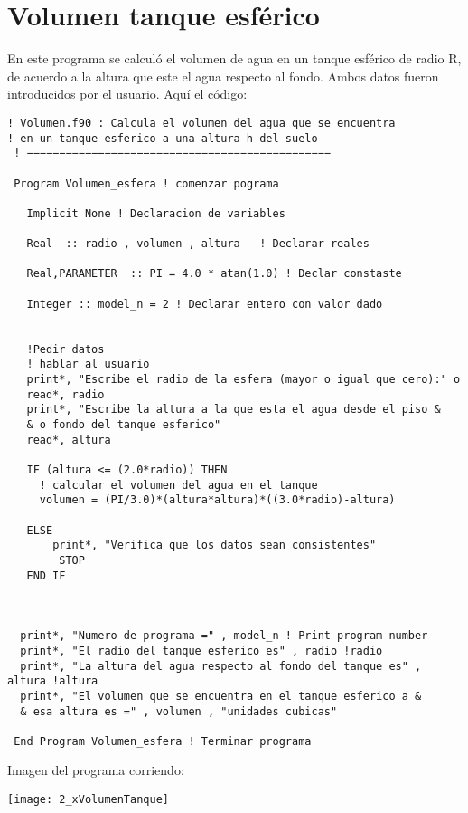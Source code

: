 \documentclass[notitlepage,12pt]{article}
\begin{document}
\section{Volumen tanque esf\'erico}
En este programa se calcul\'o el volumen de agua en un tanque esf\'erico de radio R,
de acuerdo a la altura que este el agua respecto al fondo. Ambos datos fueron introducidos
por el usuario.
Aqu\'i el c\'odigo:
\begin{verbatim}
! Volumen.f90 : Calcula el volumen del agua que se encuentra 
! en un tanque esferico a una altura h del suelo
 ! −−−−−−−−−−−−−−−−−−−−−−−−−−−−−−−−−−−−−−−−−−−−−−−

 Program Volumen_esfera ! comenzar pograma

   Implicit None ! Declaracion de variables

   Real  :: radio , volumen , altura   ! Declarar reales

   Real,PARAMETER  :: PI = 4.0 * atan(1.0) ! Declar constaste

   Integer :: model_n = 2 ! Declarar entero con valor dado

   
   !Pedir datos
   ! hablar al usuario
   print*, "Escribe el radio de la esfera (mayor o igual que cero):" o
   read*, radio
   print*, "Escribe la altura a la que esta el agua desde el piso &
   & o fondo del tanque esferico"   
   read*, altura

   IF (altura <= (2.0*radio)) THEN
     ! calcular el volumen del agua en el tanque   
     volumen = (PI/3.0)*(altura*altura)*((3.0*radio)-altura)
   
   ELSE
       print*, "Verifica que los datos sean consistentes"
        STOP
   END IF
  


  print*, "Numero de programa =" , model_n ! Print program number
  print*, "El radio del tanque esferico es" , radio !radio
  print*, "La altura del agua respecto al fondo del tanque es" , altura !altura
  print*, "El volumen que se encuentra en el tanque esferico a &
  & esa altura es =" , volumen , "unidades cubicas" 

 End Program Volumen_esfera ! Terminar programa
\end{verbatim}
Imagen del programa corriendo:



\texttt{[image: 2\_xVolumenTanque]}
\end{document}
